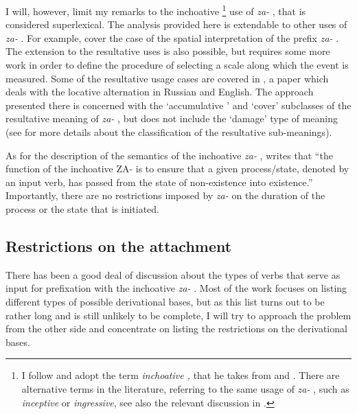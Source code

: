 I will, however, limit my remarks to the inchoative \footnote{I follow \citet{Braginsky:08} and adopt the term \textit{inchoative ,} that he takes from \citet{Zemskaja:55} and \citet{Zaliznjak:95}. There are alternative terms in the literature, referring to the same usage of \textit{za-}  , such as \textit{inceptive } or \textit{ingressive}, see also the relevant discussion in \citealt{Maslov:65}.} use of \textit{za-}  , that is considered superlexical. The analysis provided here is extendable to other uses of \textit{za-}  . For example, \cite{ZinovaOsswald:paper} cover the case of the spatial  interpretation of the prefix \textit{za-}  . The extension to the resultative  uses is also possible, but requires some more work in order to define the procedure of selecting a scale along which the event is measured. Some of the resultative  usage cases are covered in \citet{Zinova:14}, a paper which deals with the locative alternation in Russian and English. The approach presented there is concerned with the `accumulative ' and `cover' subclasses of the resultative  meaning of \textit{za-}  , but does not include the `damage' type of meaning (see \citealt{Braginsky:08} for more details about the classification of the resultative  sub-meanings).

As for the description of the semantics of the inchoative  \textit{za-}  , \citet{Braginsky:08} writes \citep[following][]{Sheljakin:69} that ``the function of the inchoative  ZA- is to ensure that a given process\slash state, denoted by an input verb, has passed from the state of non-existence into existence.'' Importantly, there are no restrictions imposed by \textit{za-}   on the duration of the process or the state that is initiated.

\subsection{Restrictions on the attachment}
There has been a good deal of discussion about the types of verbs that serve as input for prefixation  with the inchoative  \textit{za-}   \citep{Isachenko:60, Zemskaja:55, Sheljakin:69, Zaliznjak:95, Braginsky:08}. Most of the work focuses on listing different types of possible derivational bases, but as this list turns out to be rather long and is still unlikely to be complete, I will try to approach the problem from the other side and concentrate on listing the restrictions on the derivational bases.

